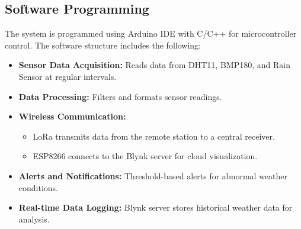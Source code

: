 \documentclass[conference, onecolumn]{IEEEtran}
\begin{document}
\subsection{Software Programming}
The system is programmed using Arduino IDE with C/C++ for microcontroller control. The software structure includes the following:
\begin{itemize}
    \item \textbf{Sensor Data Acquisition:} Reads data from DHT11, BMP180, and Rain Sensor at regular intervals.
    \item \textbf{Data Processing:} Filters and formats sensor readings.
    \item \textbf{Wireless Communication:}
    \begin{itemize}
        \item LoRa transmits data from the remote station to a central receiver.
        \item ESP8266 connects to the Blynk server for cloud visualization.
    \end{itemize}
    \item \textbf{Alerts and Notifications:} Threshold-based alerts for abnormal weather conditions.
    \item \textbf{Real-time Data Logging:} Blynk server stores historical weather data for analysis.
\end{itemize}
\end{document}
